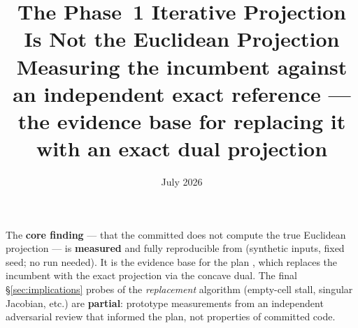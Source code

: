 \documentclass[11pt,a4paper]{article}
\title{\textbf{The Phase~1 Iterative Projection Is Not the Euclidean Projection}\\[0.5em]
  \large Measuring the incumbent \code{orthogonal\_projection\_iterative} against an
  independent exact reference --- the evidence base for replacing it with an exact dual
  projection}
\author{}
\date{July 2026}
\begin{document}
\maketitle

\begin{tcolorbox}[colback=green!5!white, colframe=green!55!black,
                  title={Status --- measured (core finding); partial (replacement-algorithm
                  probes)},
                  fontupper=\small]
The \textbf{core finding} --- that the committed 
does not compute the true Euclidean projection --- is \textbf{measured} and fully
reproducible from  (synthetic inputs, fixed seed; no
 run needed). It is the evidence base for the plan
, which replaces the incumbent
with the exact projection via the concave dual. The final \S\ref{sec:implications}
probes of the \emph{replacement} algorithm (empty-cell stall, singular Jacobian, etc.)
are \textbf{partial}: prototype measurements from an independent adversarial review that
informed the plan, not properties of committed code.
\end{tcolorbox}
\end{document}
